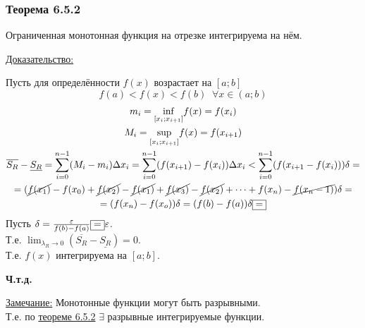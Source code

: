 \documentclass[12pt]{article}
\begin{document}
    \subsubsection*{Теорема 6.5.2}\label{th:6.5.2}
    Ограниченная монотонная функция на отрезке интегрируема на нём.\par\noindent
    \underline{Доказательство:}
    \begin{adjustwidth}{1.5em}{1.5em}
        Пусть для определённости $f(x)$ возрастает на $[a;b]$
        \[ f(a)<f(x)<f(b) \;\; \forall x \in (a;b)\]
        \begin{gather*}
            m_i=\underset{[x_i;x_{i+1}]}{\inf}f(x) = f(x_i)\\
            M_i = \underset{[x_i;x_{i+1}]}{\sup}f(x)=f(x_{i+1})\\
            \overline{S_R}-\underline{S_R}=\sum_{i=0}^{n-1} (M_i-m_i) \Delta x_i = \sum_{i=0}^{n-1}(f(x_{i+1})-f(x_i))\Delta x_i < \sum_{i=0}^{n-1}(f(x_{i+1}-f(x_i)))\delta =\\
            = (\cancel{f(x_1)} - f(x_0) + \cancel{f(x_2)} - \cancel{f(x_1)} + \cancel{f(x_3)} - \cancel{f(x_2)} + \dots + f(x_n) - \cancel{f(x_n - 1)})\delta =\\
            = (f(x_n)-f(x_o))\delta = (f(b)-f(a))\delta \fbox{=}
        \end{gather*}
        Пусть $\delta=\frac{\varepsilon}{f(b)-f(a)} \fbox{=} \varepsilon$.\\
        Т.е. $\lim_{\lambda_R \to 0}(\overline{S_R}-\underline{S_R})=0$.\\
        Т.е. $f(x)$ интегрируема на $[a; b]$.
        \begin{center}
            \textbf{Ч.т.д.}
        \end{center}
    \end{adjustwidth}
    \underline{Замечание:}
    Монотонные функции могут быть разрывными.\\
    Т.е. по \hyperref[th:6.5.2]{теореме 6.5.2} $\exists$ разрывные интегрируемые функции.
\end{document}
